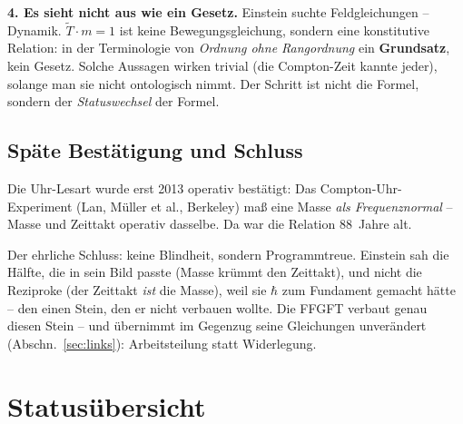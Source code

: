 \documentclass[11pt]{report}
\begin{document}
\textbf{4. Es sieht nicht aus wie ein Gesetz.} Einstein suchte
Feldgleichungen -- Dynamik. $\tilde T \cdot m = 1$ ist keine
Bewegungsgleichung, sondern eine konstitutive Relation: in der
Terminologie von \emph{Ordnung ohne Rangordnung} ein
\textbf{Grundsatz}, kein Gesetz. Solche Aussagen wirken trivial
(die Compton-Zeit kannte jeder), solange man sie nicht ontologisch
nimmt. Der Schritt ist nicht die Formel, sondern der
\emph{Statuswechsel} der Formel.

\section{Späte Bestätigung und Schluss}

Die Uhr-Lesart wurde erst 2013 operativ bestätigt: Das
Compton-Uhr-Experiment (Lan, Müller et al., Berkeley) maß eine
Masse \emph{als Frequenznormal} -- Masse und Zeittakt operativ
dasselbe. Da war die Relation 88~Jahre alt.

Der ehrliche Schluss: keine Blindheit, sondern Programmtreue.
Einstein sah die Hälfte, die in sein Bild passte (Masse krümmt den
Zeittakt), und nicht die Reziproke (der Zeittakt \emph{ist} die
Masse), weil sie $\hbar$ zum Fundament gemacht hätte -- den einen
Stein, den er nicht verbauen wollte. Die FFGFT verbaut genau diesen
Stein -- und übernimmt im Gegenzug seine Gleichungen unverändert
(Abschn.~\ref{sec:links}): Arbeitsteilung statt Widerlegung.

\chapter{Statusübersicht}
\end{document}
